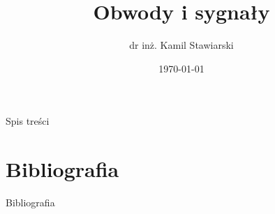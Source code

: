 \documentclass[9pt, aspectratio=169]{beamer}
\title[Tytuł w stopce]{Obwody i sygnały}
\author[Autor w stopce]{dr inż. Kamil Stawiarski}
\institute{Politechnika Gdańska}
\date[Data w stopce]{\today}
\begin{document}
\titlepage

\begin{frame}[allowframebreaks]{Spis treści}
  \tableofcontents
\end{frame}

































\section{Bibliografia}
\begin{frame}[allowframebreaks]{Bibliografia}
  \nocite{*}

  \renewcommand*{\bibfont}{\normalfont\small}
  \printbibliography
\end{frame}

\endpage
\end{document}
